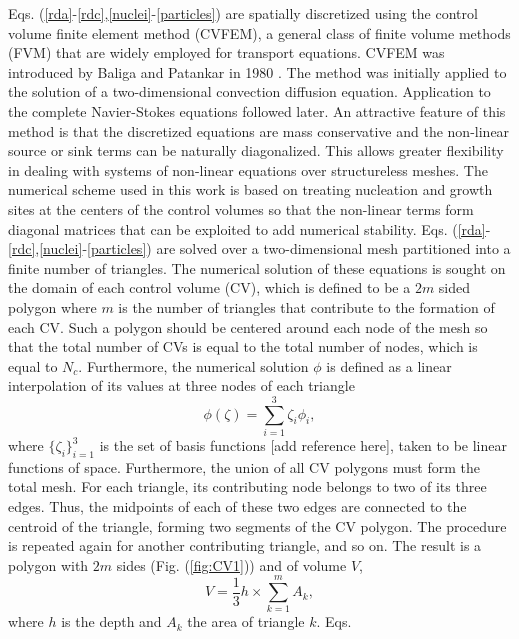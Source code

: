 \documentclass[aps,preprint]{revtex4}
\begin{document}
Eqs. (\ref{rda}-\ref{rdc},\ref{nuclei}-\ref{particles}) are spatially
discretized using the control volume finite element method (CVFEM), a general
class of finite volume methods (FVM) that are widely employed for transport
equations. CVFEM was introduced by Baliga and Patankar in 1980 \cite{CVFEM1}.
The method was initially applied to the solution of a two-dimensional
convection diffusion equation. Application to the complete Navier-Stokes
equations followed later\cite{CVFEM2}. An attractive feature of this
method is that the discretized equations are mass conservative and the non-linear
source or sink terms can be naturally diagonalized. This allows greater
flexibility in dealing with systems of non-linear equations over structureless
meshes. The numerical scheme used in this work is based on treating nucleation
and growth sites at the centers of the control volumes so that the non-linear
terms form diagonal matrices that can be exploited to add numerical stability.
Eqs. (\ref{rda}-\ref{rdc},\ref{nuclei}-\ref{particles}) are solved over a
two-dimensional mesh partitioned into a finite number of triangles. The
numerical solution of these equations is sought on the domain of each control
volume (CV), which is defined to be a $2m$ sided polygon where $m$ is the
number of triangles that contribute to the formation of each CV. Such a
polygon should be centered around each node of the mesh so that the total
number of CVs is equal to the total number of nodes, which is equal to $N_{c}%
$. Furthermore, the numerical solution $\phi$ is defined as a linear
interpolation of its values at three nodes of each triangle
\begin{equation}
\phi(\zeta) = \sum_{i=1}^{3} \zeta_{i} \phi_{i},\label{interpolation}%
\end{equation}
where $\{ \zeta_{i} \} _{i=1}^{3}$ is the set of basis functions [add
reference here], taken to be linear functions of space. Furthermore, the union
of all CV polygons must form the total mesh. For each triangle, its
contributing node belongs to two of its three edges. Thus, the midpoints of
each of these two edges are connected to the centroid of the triangle, forming
two segments of the CV polygon. The procedure is repeated again for another
contributing triangle, and so on. The result is a polygon with $2m$ sides
(Fig. (\ref{fig:CV1})) and of volume $V$,
\begin{equation}
V=\frac{1}{3}h\times\sum_{k=1}^{m}A_{k},
\end{equation}
where $h$ is the depth and $A_{k}$ the area of triangle $k$. Eqs.
\end{document}
